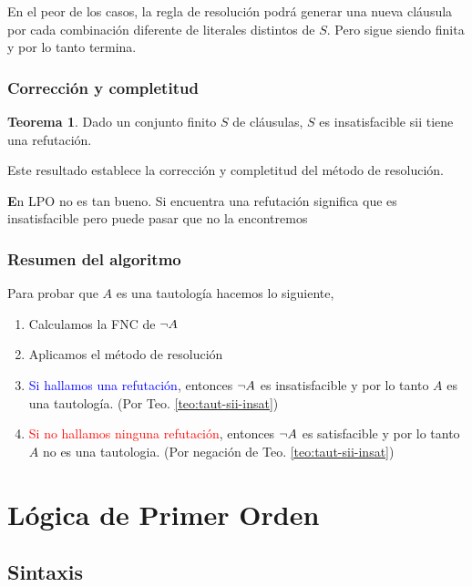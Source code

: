 \documentclass{report}
\theoremstyle{definition} %
\newtheorem{theorem}{Teorema}[chapter]
\newenvironment{nota}[1]
    {\begin{leftbar}\textbf{#1}}
    {\end{leftbar}}
\newcommand{\changed}[1]{\textcolor{Red}{#1}}
\newcommand{\select}[1]{\textcolor{Blue}{#1}}
\begin{document}
En el peor de los casos, la regla de resolución podrá generar una nueva cláusula
por cada combinación diferente de literales distintos de $S$. Pero sigue siendo
finita y por lo tanto termina.

\subsubsection{Corrección y completitud}

\begin{theorem}
    Dado un conjunto finito $S$ de cláusulas, $S$ es insatisfacible sii tiene
    una refutación.
\end{theorem}

Este resultado establece la corrección y completitud del método de resolución.

\begin{nota}
    En LPO no es tan bueno. Si encuentra una refutación significa que es
    insatisfacible pero puede pasar que no la encontremos
\end{nota}

\subsubsection{Resumen del algoritmo}

Para probar que $A$ es una tautología hacemos lo siguiente,

\begin{enumerate}
    \item Calculamos la FNC de $\neg A$
    \item Aplicamos el método de resolución
    \item \select{Si hallamos una refutación}, entonces $\neg A$ es
    insatisfacible y por lo tanto $A$ es una tautología. (Por Teo.
    \ref{teo:taut-sii-insat})
    \item \changed{Si no hallamos ninguna refutación}, entonces $\neg A$ es
    satisfacible y por lo tanto $A$ no es una tautologia. (Por negación de Teo.
    \ref{teo:taut-sii-insat})
\end{enumerate}

\section{Lógica de Primer Orden}

\subsection{Sintaxis}
\end{document}
